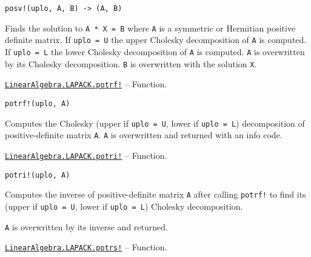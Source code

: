 \begin{adjustwidth}{2em}{0pt}


\begin{verbatim}
posv!(uplo, A, B) -> (A, B)
\end{verbatim}

Finds the solution to \texttt{A * X = B} where \texttt{A} is a symmetric or Hermitian positive definite matrix. If \texttt{uplo = U} the upper Cholesky decomposition of \texttt{A} is computed. If \texttt{uplo = L} the lower Cholesky decomposition of \texttt{A} is computed. \texttt{A} is overwritten by its Cholesky decomposition. \texttt{B} is overwritten with the solution \texttt{X}.



\end{adjustwidth}
\hypertarget{15056431266921985441}{} 
\hyperlink{15056431266921985441}{\texttt{LinearAlgebra.LAPACK.potrf!}}  -- {Function.}

\begin{adjustwidth}{2em}{0pt}


\begin{verbatim}
potrf!(uplo, A)
\end{verbatim}

Computes the Cholesky (upper if \texttt{uplo = U}, lower if \texttt{uplo = L}) decomposition of positive-definite matrix \texttt{A}. \texttt{A} is overwritten and returned with an info code.



\end{adjustwidth}
\hypertarget{17784788688709608363}{} 
\hyperlink{17784788688709608363}{\texttt{LinearAlgebra.LAPACK.potri!}}  -- {Function.}

\begin{adjustwidth}{2em}{0pt}


\begin{verbatim}
potri!(uplo, A)
\end{verbatim}

Computes the inverse of positive-definite matrix \texttt{A} after calling \texttt{potrf!} to find its (upper if \texttt{uplo = U}, lower if \texttt{uplo = L}) Cholesky decomposition.

\texttt{A} is overwritten by its inverse and returned.



\end{adjustwidth}
\hypertarget{13026081165818770600}{} 
\hyperlink{13026081165818770600}{\texttt{LinearAlgebra.LAPACK.potrs!}}  -- {Function.}

